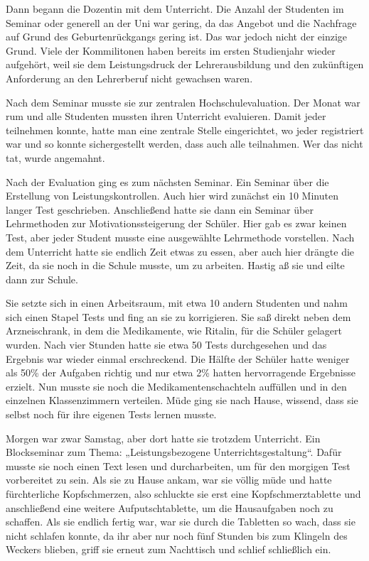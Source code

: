 \documentclass[12pt,a4paper]{article}
\begin{document}
\begin{appendix}
Dann begann die Dozentin mit dem Unterricht. Die Anzahl der Studenten im Seminar oder generell an der Uni war gering, da das Angebot und die Nachfrage auf Grund des Geburtenrückgangs gering ist. Das war jedoch nicht der einzige Grund. Viele der Kommilitonen haben bereits im ersten Studienjahr wieder aufgehört, weil sie dem Leistungsdruck der Lehrerausbildung und den zukünftigen Anforderung an den Lehrerberuf nicht gewachsen waren. 

Nach dem Seminar musste sie zur zentralen Hochschulevaluation. Der Monat war rum und alle Studenten mussten ihren Unterricht evaluieren. Damit jeder teilnehmen konnte, hatte man eine zentrale Stelle eingerichtet, wo jeder registriert war und so konnte sichergestellt werden, dass auch alle teilnahmen. Wer das nicht tat, wurde angemahnt. 

Nach der Evaluation ging es zum nächsten Seminar. Ein Seminar über die Erstellung von Leistungskontrollen. Auch hier wird zunächst ein 10 Minuten langer Test geschrieben. Anschließend hatte sie dann ein Seminar über Lehrmethoden zur Motivationssteigerung der Schüler. Hier gab es zwar keinen Test, aber jeder Student musste eine ausgewählte Lehrmethode vorstellen. Nach dem Unterricht hatte sie endlich Zeit etwas zu essen, aber auch hier drängte die Zeit, da sie noch in die Schule musste, um zu arbeiten. Hastig aß sie und eilte dann zur Schule. 

Sie setzte sich in einen Arbeitsraum, mit etwa 10 andern Studenten und nahm sich einen Stapel Tests und fing an sie zu korrigieren. Sie saß direkt neben dem Arzneischrank, in dem die Medikamente, wie Ritalin, für die Schüler gelagert wurden. Nach vier Stunden hatte sie etwa 50 Tests durchgesehen und das Ergebnis war wieder einmal erschreckend. Die Hälfte der Schüler hatte weniger als 50\% der Aufgaben richtig und nur etwa 2\% hatten hervorragende Ergebnisse erzielt. Nun musste sie noch die Medikamentenschachteln auffüllen und in den einzelnen Klassenzimmern verteilen. Müde ging sie nach Hause, wissend, dass sie selbst noch  für ihre eigenen Tests lernen musste. 

Morgen war zwar Samstag, aber dort hatte sie trotzdem Unterricht. Ein Blockseminar zum Thema: „Leistungsbezogene Unterrichtsgestaltung“. Dafür musste sie noch einen Text lesen und durcharbeiten, um für den morgigen Test vorbereitet zu sein. Als sie zu Hause ankam, war sie völlig müde und hatte fürchterliche Kopfschmerzen, also schluckte sie erst eine Kopfschmerztablette und anschließend eine weitere Aufputschtablette, um die Hausaufgaben noch zu schaffen. Als sie endlich fertig war, war sie durch die Tabletten so wach, dass sie nicht schlafen konnte, da ihr aber nur noch fünf Stunden bis zum Klingeln des Weckers blieben, griff sie erneut zum Nachttisch und schlief schließlich ein.  
\end{appendix}
\end{document}
